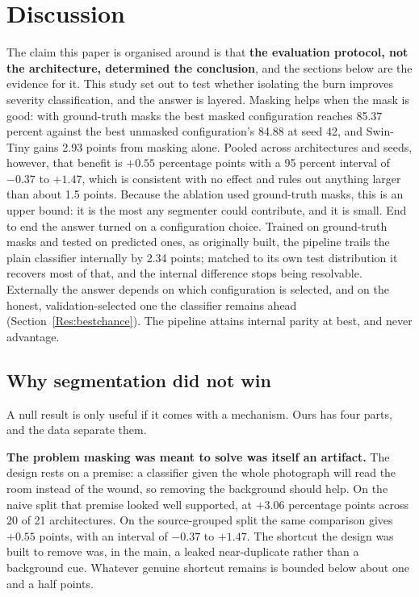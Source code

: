 \documentclass{melba}
\begin{document}
\section{Discussion}
\label{Dis}
The claim this paper is organised around is that \textbf{the evaluation protocol, not the architecture, determined the conclusion}, and the sections below are the evidence for it. This study set out to test whether isolating the burn improves severity classification, and the answer is layered. Masking helps when the mask is good: with ground-truth masks the best masked configuration reaches 85.37 percent against the best unmasked configuration's 84.88 at seed 42, and Swin-Tiny gains 2.93 points from masking alone. Pooled across architectures and seeds, however, that benefit is $+0.55$ percentage points with a 95 percent interval of $-0.37$ to $+1.47$, which is consistent with no effect and rules out anything larger than about 1.5 points. Because the ablation used ground-truth masks, this is an upper bound: it is the most any segmenter could contribute, and it is small. End to end the answer turned on a configuration choice. Trained on ground-truth masks and tested on predicted ones, as originally built, the pipeline trails the plain classifier internally by 2.34 points; matched to its own test distribution it recovers most of that, and the internal difference stops being resolvable. Externally the answer depends on which configuration is selected, and on the honest, validation-selected one the classifier remains ahead (Section~\ref{Res:bestchance}). The pipeline attains internal parity at best, and never advantage.

\subsection{Why segmentation did not win}
\label{Dis:why}
A null result is only useful if it comes with a mechanism. Ours has four parts, and the data separate them.

\textbf{The problem masking was meant to solve was itself an artifact.} The design rests on a premise: a classifier given the whole photograph will read the room instead of the wound, so removing the background should help. On the naive split that premise looked well supported, at $+3.06$ percentage points across 20 of 21 architectures. On the source-grouped split the same comparison gives $+0.55$ points, with an interval of $-0.37$ to $+1.47$. The shortcut the design was built to remove was, in the main, a leaked near-duplicate rather than a background cue. Whatever genuine shortcut remains is bounded below about one and a half points.
\end{document}

